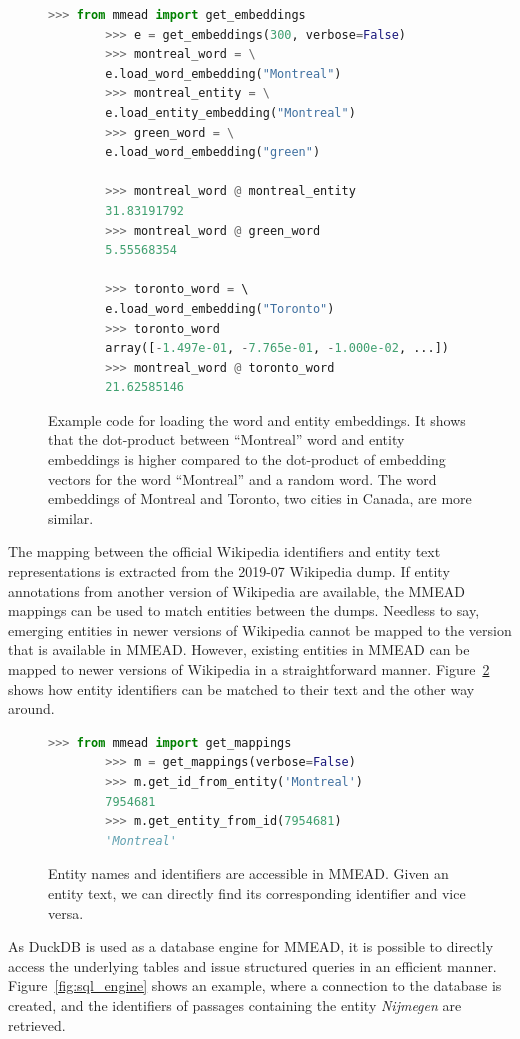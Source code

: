 \begin{figure}[!t]
	\begin{lstlisting}[language=python]
		>>> from mmead import get_embeddings
		>>> e = get_embeddings(300, verbose=False)
		>>> montreal_word = \
		e.load_word_embedding("Montreal")
		>>> montreal_entity = \
		e.load_entity_embedding("Montreal")
		>>> green_word = \
		e.load_word_embedding("green")
		
		>>> montreal_word @ montreal_entity
		31.83191792
		>>> montreal_word @ green_word
		5.55568354
		
		>>> toronto_word = \ 
		e.load_word_embedding("Toronto")
		>>> toronto_word
		array([-1.497e-01, -7.765e-01, -1.000e-02, ...])
		>>> montreal_word @ toronto_word
		21.62585146
	\end{lstlisting}
	\caption{Example code for loading the word and entity embeddings. It shows that the dot-product between ``Montreal'' word and entity embeddings is higher compared to the dot-product of embedding vectors for the word ``Montreal'' and a random word. The word embeddings of Montreal and Toronto, two cities in Canada, are more similar.}
	\label{fig:dot-product}
\end{figure}

The mapping between the official Wikipedia identifiers and entity text representations is extracted from the 2019-07 Wikipedia dump. If entity annotations from another version of Wikipedia are available, the MMEAD mappings can be used to match entities between the dumps. 
Needless to say, emerging entities in newer versions of Wikipedia cannot be mapped to the version that is available in MMEAD. However, existing entities in MMEAD can be mapped to newer versions of Wikipedia in a straightforward manner.
Figure~\ref{fig:load_mappings} shows how entity identifiers can be matched to their text and the other way around.  

\begin{figure}[!t]
	\begin{lstlisting}[language=python]
		>>> from mmead import get_mappings
		>>> m = get_mappings(verbose=False)
		>>> m.get_id_from_entity('Montreal')
		7954681
		>>> m.get_entity_from_id(7954681)
		'Montreal'
	\end{lstlisting}
	\caption{Entity names and identifiers are accessible in MMEAD. Given an entity text, we can directly find its corresponding identifier and vice versa.}
	\label{fig:load_mappings}
\end{figure}

As DuckDB is used as a database engine for MMEAD, it is possible to directly access the underlying tables and issue structured queries in an efficient manner. Figure~\ref{fig:sql_engine} shows an example, where a connection to the database is created, and the identifiers of passages containing the entity \emph{Nijmegen} are retrieved.

